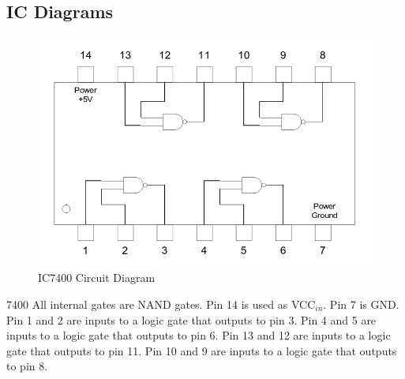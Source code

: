 \documentclass[11pt,a4paper]{article}
\begin{document}
\subsection{IC Diagrams}
\begin{figure}[h]
    \centering
    \includegraphics[width=5in]{IC.png}
    \caption{IC7400 Circuit Diagram}
\end{figure}7400
All internal gates are NAND gates.
Pin 14 is used as VCC$_{in}$. Pin 7 is GND.
Pin 1 and 2 are inputs to a logic gate that outputs to pin 3.
Pin 4 and 5 are inputs to a logic gate that outputs to pin 6.
Pin 13 and 12 are inputs to a logic gate that outputs to pin 11.
Pin 10 and 9 are inputs to a logic gate that outputs to pin 8.
\end{document}
